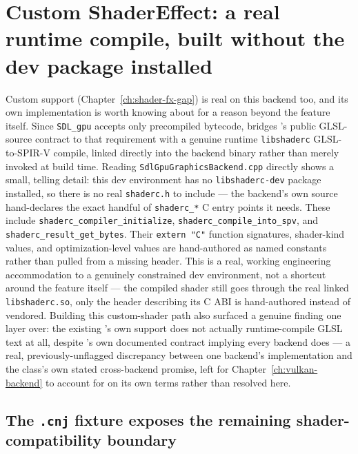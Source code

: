 \section{Custom ShaderEffect: a real runtime compile, built without the dev package installed}

Custom  support (Chapter~\ref{ch:shader-fx-gap}) is real on this backend
too, and its own implementation is worth knowing about for a reason beyond the feature itself.
Since \texttt{SDL\_gpu} accepts only precompiled bytecode,  bridges
's public GLSL-source contract to that requirement with a genuine runtime
\texttt{libshaderc} GLSL-to-SPIR-V compile, linked directly into the backend binary rather than
merely invoked at build time. Reading \texttt{SdlGpuGraphicsBackend.cpp} directly shows a small,
telling detail: this dev environment has no \texttt{libshaderc-dev} package installed, so there
is no real \texttt{shaderc.h} to include --- the backend's own source hand-declares the exact
handful of \texttt{shaderc\_*} C entry points it needs. These include
\texttt{shaderc\_\allowbreak{}compiler\_\allowbreak{}initialize},
\texttt{shaderc\_\allowbreak{}compile\_\allowbreak{}into\_\allowbreak{}spv}, and
\texttt{shaderc\_\allowbreak{}result\_\allowbreak{}get\_\allowbreak{}bytes}. Their
\texttt{extern "C"} function signatures, shader-kind values, and optimization-level values are
hand-authored as named constants rather than pulled from a missing header.
This is a real, working engineering accommodation to a genuinely constrained dev environment,
not a shortcut around the feature itself --- the compiled shader still goes through the real
linked \texttt{libshaderc.so}, only the header describing its C ABI is hand-authored instead of
vendored. Building this custom-shader path also surfaced a genuine finding one layer over: the
existing 's own  support does not
actually runtime-compile GLSL text at all, despite 's own documented
contract implying every backend does --- a real, previously-unflagged discrepancy between one
backend's implementation and the class's own stated cross-backend promise, left for
Chapter~\ref{ch:vulkan-backend} to account for on its own terms rather than resolved here.

\subsection{The \texttt{.cnj} fixture exposes the remaining shader-compatibility boundary}

